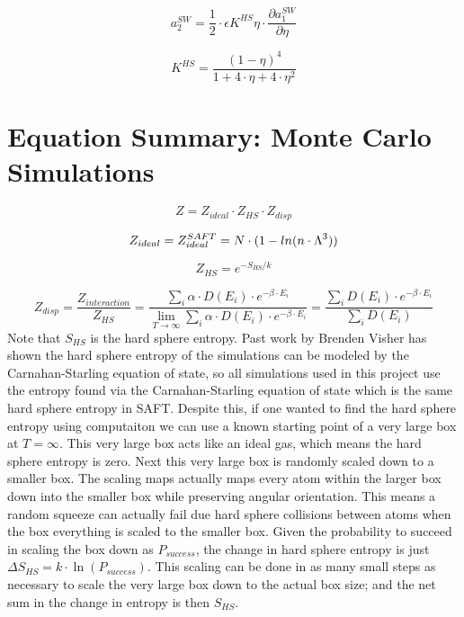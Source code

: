 \begin{multicols}{2}
\begin{equation}\label{eq:saft38}
a_2^{SW}=\frac{1}{2}\cdot \epsilon K^{HS}\eta\cdot \frac{\partial a_1^{SW}}{\partial \eta}
\end{equation}

\begin{equation}\label{eq:saft22}
K^{HS}=\frac{(1-\eta)^4}{1+4\cdot \eta+4\cdot \eta^2}
\end{equation}
\end{multicols}

\section{Equation Summary: Monte Carlo Simulations}
\begin{equation}\label{eq:MC1}
Z=Z_{ideal}\cdot Z_{HS}\cdot Z_{disp}
\end{equation}

\begin{equation}\label{eq:MC2}
Z_{ideal}=Z_{ideal}^{SAFT}=N\cdot(1-\\ln(n\cdot \Lambda^3))
\end{equation}

\begin{equation}\label{eq:MC3}
Z_{HS}=e^{-S_{HS}/k}
\end{equation}

\begin{equation}\label{eq:MC4}
Z_{disp}=\frac{Z_{interaction}}{Z_{HS}}=\frac{\sum_i \alpha\cdot D(E_i)\cdot e^{-\beta\cdot E_i}}{\lim_{T\to\infty}\sum_i \alpha\cdot D(E_i)\cdot e^{-\beta\cdot E_i}}=\frac{\sum_i D(E_i)\cdot e^{-\beta\cdot E_i}}{\sum_i D(E_i)}
\end{equation}
Note that $S_{HS}$ is the hard sphere entropy. Past work by Brenden Visher\cite{Brenden} has shown the hard sphere entropy of the simulations can be modeled by the Carnahan-Starling equation of state, so all simulations used in this project use the entropy found via the Carnahan-Starling equation of state which is the same hard sphere entropy in SAFT. Despite this, if one wanted to find the hard sphere entropy using computaiton we can use a known starting point of a very large box at $T=\infty$. This very large box acts like an ideal gas, which means the hard sphere entropy is zero. Next this very large box is randomly scaled down to a smaller box. The scaling maps actually maps every atom within the larger box down into the smaller box while preserving angular orientation. This means a random squeeze can actually fail due hard sphere collisions between atoms when the box everything is scaled to the smaller box. Given the probability to succeed in scaling the box down as $P_{success}$, the change in hard sphere entropy is just $\Delta S_{HS}=k\cdot \ln(P_{success})$. This scaling can be done in as many small steps as necessary to scale the very large box down to the actual box size; and the net sum in the change in entropy is then $S_{HS}$.

